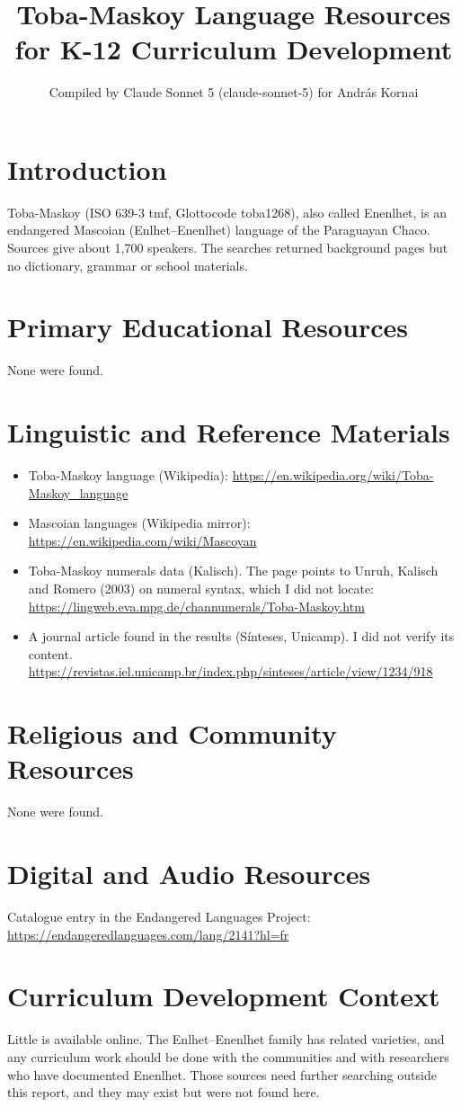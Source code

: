 \documentclass[12pt]{article}
\title{Toba-Maskoy Language Resources for K-12 Curriculum Development}
\author{Compiled by Claude Sonnet 5 (claude-sonnet-5) for Andr\'as Kornai}
\date{}
\begin{document}
\maketitle

\section{Introduction}
Toba-Maskoy (ISO 639-3 tmf, Glottocode toba1268), also called Enenlhet, is an endangered Mascoian (Enlhet--Enenlhet) language of the Paraguayan Chaco. Sources give about 1,700 speakers. The searches returned background pages but no dictionary, grammar or school materials.

\section{Primary Educational Resources}
None were found.

\section{Linguistic and Reference Materials}
\begin{itemize}
\item Toba-Maskoy language (Wikipedia): \url{https://en.wikipedia.org/wiki/Toba-Maskoy_language}
\item Mascoian languages (Wikipedia mirror): \url{https://en.wikipedia.com/wiki/Mascoyan}
\item Toba-Maskoy numerals data (Kalisch). The page points to Unruh, Kalisch and Romero (2003) on numeral syntax, which I did not locate: \url{https://lingweb.eva.mpg.de/channumerals/Toba-Maskoy.htm}
\item A journal article found in the results (Sínteses, Unicamp). I did not verify its content. \url{https://revistas.iel.unicamp.br/index.php/sinteses/article/view/1234/918}
\end{itemize}

\section{Religious and Community Resources}
None were found.

\section{Digital and Audio Resources}
Catalogue entry in the Endangered Languages Project: \url{https://endangeredlanguages.com/lang/2141?hl=fr}

\section{Curriculum Development Context}
Little is available online. The Enlhet--Enenlhet family has related varieties, and any curriculum work should be done with the communities and with researchers who have documented Enenlhet. Those sources need further searching outside this report, and they may exist but were not found here.
\end{document}
